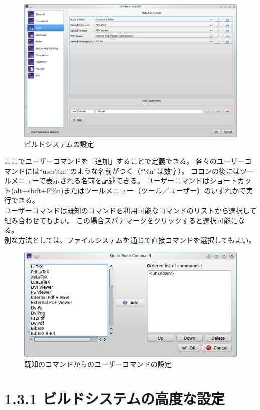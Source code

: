 \documentclass[]{book}
\makeatletter
\def\maxwidth{\ifdim\Gin@nat@width>\linewidth\linewidth
\else\Gin@nat@width\fi}
\let\Oldincludegraphics\includegraphics
\renewcommand{\includegraphics}[1]{\Oldincludegraphics[width=\maxwidth]{#1}}
\makeatother
\begin{document}
\begin{figure}[htbp]
\centering
\includegraphics{configure_build.png}
\caption{ビルドシステムの設定}
\end{figure}

ここでユーザーコマンドを「追加」することで定義できる。
各々のユーザーコマンドには``user\%n:''のような名前がつく（``\%n''は数字）。
コロンの後にはツールメニューで表示される名前を記述できる。
ユーザーコマンドはショートカット(alt+shift+F\%n)またはツールメニュー（ツール／ユーザー）のいずれかで実行できる。\\
ユーザーコマンドは既知のコマンドを利用可能なコマンドのリストから選択して組み合わせてもよい。
この場合スパナマークをクリックすると選択可能になる。\\
別な方法としては、ファイルシステムを通じて直接コマンドを選択してもよい。

\begin{figure}[htbp]
\centering
\includegraphics{doc21.png}
\caption{既知のコマンドからのユーザーコマンドの設定}
\end{figure}

\section{1.3.1 ビルドシステムの高度な設定}
\end{document}
